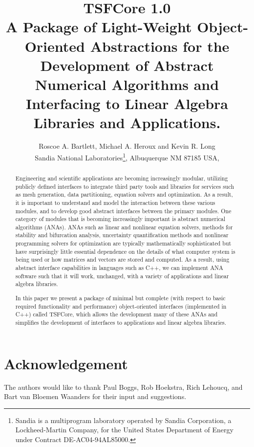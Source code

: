 \documentclass[pdf,ps2pdf,11pt]{SANDreport}
\title{
{\Huge\bf TSFCore 1.0}\\[1.5ex]
A Package of Light-Weight Object-Oriented Abstractions for the
Development of Abstract Numerical Algorithms and Interfacing
to Linear Algebra Libraries and Applications.
}
\author{Roscoe A. Bartlett, Michael A. Heroux and Kevin R. Long \\
Sandia National Laboratories\footnote{
Sandia is a multiprogram laboratory operated by Sandia Corporation, a
Lockheed-Martin Company, for the United States Department of Energy
under Contract DE-AC04-94AL85000.}, Albuquerque NM 87185 USA, \\
}
\date{}
\begin{document}
\maketitle


%
\begin{abstract}
%
Engineering and scientific applications are becoming increasingly
modular, utilizing publicly defined interfaces to integrate
third party tools and libraries for services such as
mesh generation, data partitioning, equation solvers and optimization.
As a result, it is important to understand and model the interaction between 
these various modules, and to develop good abstract interfaces between
the primary modules.  One category of modules that is becoming
increasingly important is abstract numerical algorithms (ANAs).  ANAs
such as linear and nonlinear equation solvers,
methods for stability and bifurcation analysis,
uncertainty quantification methods and nonlinear programming solvers
for optimization are typically mathematically 
sophisticated but have surprisingly little essential dependence on the
details of what computer system is being used or how matrices and
vectors are stored and computed.  As a result, using abstract
interface capabilities in languages such as C++, we can implement ANA
software such that it will work, unchanged, with a variety of
applications and linear algebra libraries.

In this paper we present a package of minimal but complete (with
respect to basic required functionality and performance)
object-oriented interfaces (implemented in C++) called TSFCore, which
allows the development many of these ANAs and simplifies the
development of interfaces to applications and linear algebra
libraries.
%
\end{abstract}
%

%
\clearpage
\section*{Acknowledgement}
The authors would like to thank Paul Boggs, Rob Hoekstra, Rich
Lehoucq, and Bart van Bloemen Waanders for their input and
suggestions.
\end{document}
